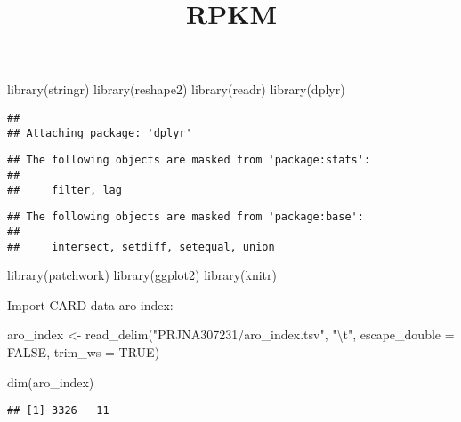 \documentclass[
]{article}
\title{RPKM}
\author{}
\date{\vspace{-2.5em}}
\newenvironment{Shaded}{\begin{snugshade}}{\end{snugshade}}
\newcommand{\AttributeTok}[1]{\textcolor[rgb]{0.77,0.63,0.00}{#1}}
\newcommand{\ConstantTok}[1]{\textcolor[rgb]{0.00,0.00,0.00}{#1}}
\newcommand{\FunctionTok}[1]{\textcolor[rgb]{0.00,0.00,0.00}{#1}}
\newcommand{\NormalTok}[1]{#1}
\newcommand{\OtherTok}[1]{\textcolor[rgb]{0.56,0.35,0.01}{#1}}
\newcommand{\SpecialCharTok}[1]{\textcolor[rgb]{0.00,0.00,0.00}{#1}}
\newcommand{\StringTok}[1]{\textcolor[rgb]{0.31,0.60,0.02}{#1}}
\begin{document}
\maketitle

{
\setcounter{tocdepth}{2}
\tableofcontents
}
\begin{Shaded}
\begin{Highlighting}[]
\FunctionTok{library}\NormalTok{(stringr)}
\FunctionTok{library}\NormalTok{(reshape2)}
\FunctionTok{library}\NormalTok{(readr)}
\FunctionTok{library}\NormalTok{(dplyr)}
\end{Highlighting}
\end{Shaded}

\begin{verbatim}
## 
## Attaching package: 'dplyr'
\end{verbatim}

\begin{verbatim}
## The following objects are masked from 'package:stats':
## 
##     filter, lag
\end{verbatim}

\begin{verbatim}
## The following objects are masked from 'package:base':
## 
##     intersect, setdiff, setequal, union
\end{verbatim}

\begin{Shaded}
\begin{Highlighting}[]
\FunctionTok{library}\NormalTok{(patchwork)}
\FunctionTok{library}\NormalTok{(ggplot2)}
\FunctionTok{library}\NormalTok{(knitr)}
\end{Highlighting}
\end{Shaded}

Import CARD data aro index:

\begin{Shaded}
\begin{Highlighting}[]
\NormalTok{aro\_index }\OtherTok{\textless{}{-}} \FunctionTok{read\_delim}\NormalTok{(}\StringTok{"PRJNA307231/aro\_index.tsv"}\NormalTok{, }
    \StringTok{"}\SpecialCharTok{\textbackslash{}t}\StringTok{"}\NormalTok{, }\AttributeTok{escape\_double =} \ConstantTok{FALSE}\NormalTok{, }\AttributeTok{trim\_ws =} \ConstantTok{TRUE}\NormalTok{)}

\FunctionTok{dim}\NormalTok{(aro\_index)}
\end{Highlighting}
\end{Shaded}

\begin{verbatim}
## [1] 3326   11
\end{verbatim}
\end{document}
